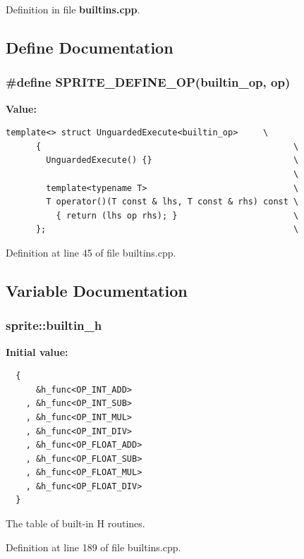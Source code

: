 Definition in file {\bf builtins.cpp}.

\subsection{Define Documentation}
\subsubsection{\setlength{\rightskip}{0pt plus 5cm}\#define SPRITE\_\-DEFINE\_\-OP(builtin\_\-op, op)}\label{builtins_8cpp_a0}


{\bf Value:}

\footnotesize\begin{verbatim}template<> struct UnguardedExecute<builtin_op>     \
      {                                                  \
        UnguardedExecute() {}                            \
                                                         \
        template<typename T>                             \
        T operator()(T const & lhs, T const & rhs) const \
          { return (lhs op rhs); }                       \
      };                                                 \
\end{verbatim}\normalsize 


Definition at line 45 of file builtins.cpp.

\subsection{Variable Documentation}
\subsubsection{ {\bf sprite::builtin\_\-h}}\label{namespacesprite_file_a0}


{\bf Initial value:}

\footnotesize\begin{verbatim}
  {
      &h_func<OP_INT_ADD>
    , &h_func<OP_INT_SUB>
    , &h_func<OP_INT_MUL>
    , &h_func<OP_INT_DIV>
    , &h_func<OP_FLOAT_ADD>
    , &h_func<OP_FLOAT_SUB>
    , &h_func<OP_FLOAT_MUL>
    , &h_func<OP_FLOAT_DIV>
  }
\end{verbatim}\normalsize 
The table of built-in H routines. 



Definition at line 189 of file builtins.cpp.